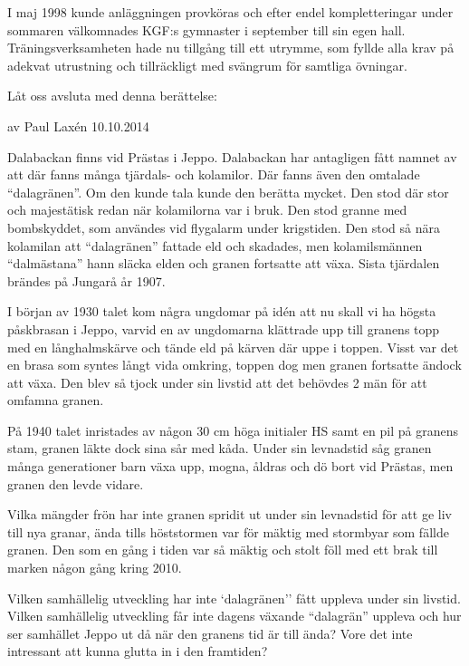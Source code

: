I maj 1998 kunde anläggningen provköras och efter endel kompletteringar under sommaren välkomnades KGF:s gymnaster i september till sin egen hall. Träningsverksamheten hade nu tillgång till ett utrymme, som fyllde alla krav på adekvat utrustning och tillräckligt med svängrum för samtliga övningar.





Låt oss avsluta med denna berättelse:

%

av Paul Laxén 10.10.2014

Dalabackan finns vid Prästas i Jeppo. Dalabackan har antagligen fått namnet av att där fanns många tjärdals- och kolamilor. Där fanns även den omtalade ``dalagränen''. Om den kunde tala kunde den berätta mycket. Den stod där stor och majestätisk redan när kolamilorna var i bruk. Den stod granne med bombskyddet, som användes vid flygalarm under krigstiden. Den stod så nära kolamilan att ``dalagränen'' fattade eld och skadades, men kolamilsmännen ``dalmästana'' hann släcka elden och granen fortsatte att växa. Sista tjärdalen brändes på Jungarå år 1907.

I början av 1930 talet kom några ungdomar på idén att nu skall vi ha högsta påskbrasan i Jeppo, varvid en av ungdomarna klättrade upp till granens topp med en långhalmskärve och tände eld på kärven där uppe i toppen. Visst var det en brasa som syntes långt vida omkring, toppen dog men granen fortsatte ändock att växa. Den blev så tjock under sin livstid att det behövdes 2 män för att omfamna granen.

På 1940 talet inristades av någon 30 cm höga initialer HS samt en pil på granens stam, granen läkte dock sina sår med kåda. Under sin levnadstid såg granen många generationer barn växa upp, mogna, åldras och dö bort vid Prästas, men granen den levde vidare.

Vilka mängder frön har inte granen spridit ut under sin levnadstid för att ge liv till nya granar, ända tills höststormen var för mäktig med stormbyar som fällde granen. Den som en gång i tiden var så mäktig och stolt föll med ett brak till marken någon gång kring 2010.

Vilken samhällelig utveckling har inte `dalagränen'' fått uppleva under sin livstid. Vilken samhällelig utveckling får inte dagens växande ``dalagrän'' uppleva och hur ser samhället Jeppo ut då när den granens tid är till ända? Vore det inte intressant att kunna glutta in i den framtiden?
